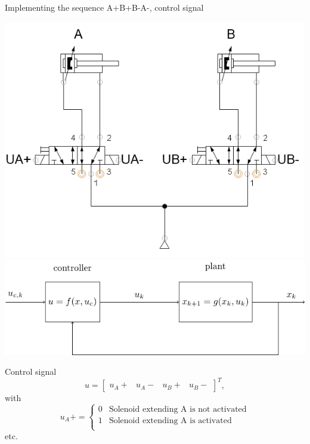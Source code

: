 \documentclass[presentation,aspectratio=1610]{beamer}
\begin{document}
\begin{frame}[label={sec:orgcc75451}]{Implementing the sequence A+B+B-A-, control signal}
\begin{center}
\includegraphics[width=0.42\linewidth]{../../figures/AplBplBminAmin-pneum.png}
\includegraphics[width=0.58\linewidth]{../../figures/logic-control-loop}
\end{center}

\begin{block}{Control signal}
 \[ u = \begin{bmatrix} u_A+ & u_A- & u_B+ & u_B- \end{bmatrix}^T, \]
 with
 \[ u_A+ = \begin{cases} 0 & \text{Solenoid extending A is not activated}\\
                               1&\text{Solenoid extending A is activated}\\
              \end{cases}
   \]
etc.
\end{block}
\end{frame}
\end{document}
